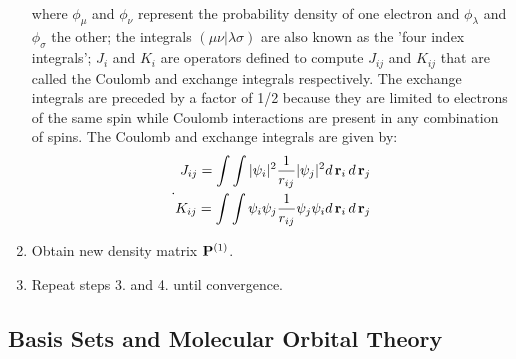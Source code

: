 \begin{enumerate}
\begin{equation}
\begin{aligned}
                        \end{aligned}
                    \end{equation}
                    where $\phi_\mu$ and $\phi_\nu$ represent the probability density of one electron and $\phi_\lambda$ and $\phi_\sigma$ the other; the integrals $(\mu \nu | \lambda \sigma)$ are also known as the 'four index integrals'; $J_i$ and $K_i$ are operators defined to compute $J_{ij}$ and $K_{ij}$ that are called the Coulomb and exchange integrals respectively. The exchange integrals are preceded by a factor of 1/2 because they are limited to electrons of the same spin while Coulomb interactions are present in any combination of spins. The Coulomb and exchange integrals are given by:
                    \begin{equation}\label{eq:Coulomb and exchange integrals}.
                        \begin{aligned}
                            J_{ij} = \displaystyle\int \int |\psi_i|^2 \frac{1}{r_{ij}} |\psi_j|^2 d\,{\mathbf {r}}_i\, d\,{\mathbf {r}}_j\\
                            K_{ij} = \displaystyle\int \int \psi_i \psi_j \frac{1}{r_{ij}} \psi_j \psi_i d\,{\mathbf {r}}_i\, d\,{\mathbf {r}}_j
                        \end{aligned}
                    \end{equation}
                     
                \item Obtain new density matrix ${\mathbf {P}}^{(1)}$.
                \item Repeat steps 3. and 4. until convergence.
            \end{enumerate}

        \subsection{Basis Sets and Molecular Orbital Theory}

